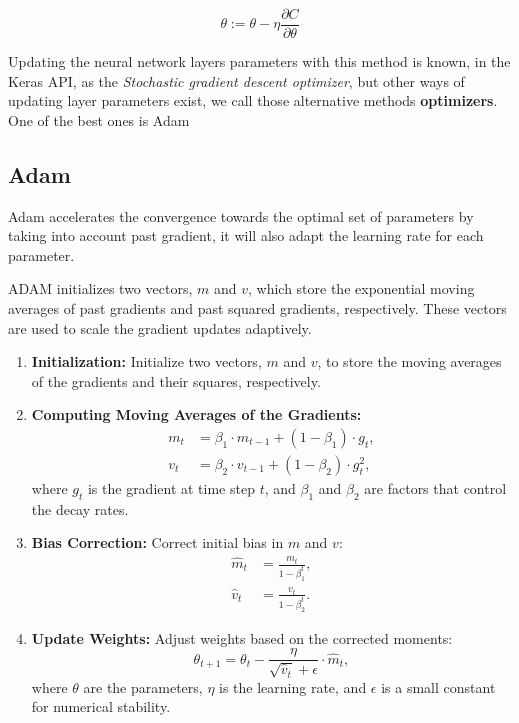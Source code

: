\documentclass[a4paper, twocolumn, twoside]{article}
\begin{document}
	$$
	\theta := \theta - \eta \frac{\partial C}{\partial \theta}
	$$

        Updating the neural network layers parameters with this method  is known, in the Keras API, as the \textit{Stochastic gradient descent optimizer},
	but other ways of updating layer parameters exist, we call those alternative methods \textbf{optimizers}. One of the best ones is Adam \cite{kingma2017adam}

	\subsection{Adam}
	Adam accelerates the convergence towards the optimal set of parameters by taking into account past gradient,
	it will also adapt the learning rate for each parameter.

	ADAM initializes two vectors, 
	$m$ and $v$, which store the exponential moving averages of past gradients and past squared gradients,
	respectively. These vectors are used to scale the gradient updates adaptively.

	\begin{enumerate}
	  \item \textbf{Initialization:} Initialize two vectors, $m$ and $v$, to store the moving averages of the gradients and their squares, respectively.
	  \item \textbf{Computing Moving Averages of the Gradients:}
		\begin{align*}
		  m_t &= \beta_1 \cdot m_{t-1} + (1 - \beta_1) \cdot g_t, \\
		  v_t &= \beta_2 \cdot v_{t-1} + (1 - \beta_2) \cdot g_t^2,
		\end{align*}
		where $g_t$ is the gradient at time step $t$, and $\beta_1$ and $\beta_2$ are factors that control the decay rates.
	  \item \textbf{Bias Correction:} Correct initial bias in $m$ and $v$:
		\begin{align*}
		  \hat{m}_t &= \frac{m_t}{1 - \beta_1^t}, \\
		  \hat{v}_t &= \frac{v_t}{1 - \beta_2^t}.
		\end{align*}
	  \item \textbf{Update Weights:} Adjust weights based on the corrected moments:
		\begin{equation*}
		  \theta_{t+1} = \theta_t - \frac{\eta}{\sqrt{\hat{v}_t} + \epsilon} \cdot \hat{m}_t,
		\end{equation*}
		where $\theta$ are the parameters, $\eta$ is the learning rate, and $\epsilon$ is a small constant for numerical stability.
	\end{enumerate}
\end{document}
